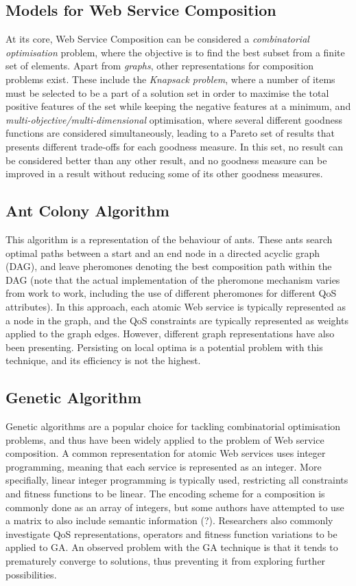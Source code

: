 \documentclass[a4paper,10pt]{article}
\begin{document}
\subsection{Models for Web Service Composition}
At its core, Web Service Composition can be considered a \textit{combinatorial optimisation} problem, where
the objective is to find the best subset from a finite set of elements. Apart from \textit{graphs}, other representations 
for composition problems exist. These include the \textit{Knapsack problem}, where a number of items must be
selected to be a part of a solution set in order to maximise the total positive features of the set while keeping
the negative features at a minimum, and \textit{multi-objective/multi-dimensional} optimisation, where several
different goodness functions are considered simultaneously, leading to a Pareto set of results that presents different
trade-offs for each goodness measure. In this set, no result can be considered better than any other result, and no goodness
measure can be improved in a result without reducing some of its other goodness measures.

\subsection{Ant Colony Algorithm}
This algorithm is a representation of the behaviour of ants. These ants search optimal paths between a start and
an end node in a directed acyclic graph (DAG), and leave pheromones denoting the best composition path within the
DAG (note that the actual implementation of the pheromone mechanism varies from work to work, including the use of
different pheromones for different QoS attributes). In this approach, each atomic Web service is typically represented
as a node in the graph, and the QoS constraints are typically represented as weights applied to the graph edges.
However, different graph representations have also been presenting. Persisting on local optima is a potential problem
with this technique, and its efficiency is not the highest.

\subsection{Genetic Algorithm}
Genetic algorithms are a popular choice for tackling combinatorial optimisation problems, and thus have been widely
applied to the problem of Web service composition. A common representation for atomic Web services uses integer programming,
meaning that each service is represented as an integer. More specifially, linear integer programming is typically used,
restricting all constraints and fitness functions to be linear. The encoding scheme for a composition is commonly done 
as an array of integers, but some authors have attempted to use a matrix to also include semantic information (?). Researchers
also commonly investigate QoS representations, operators and fitness function variations to be applied to GA. An observed
problem with the GA technique is that it tends to prematurely converge to solutions, thus preventing it from exploring further
possibilities.
\end{document}
